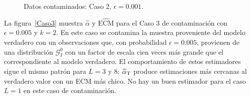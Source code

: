 \begin{figure}[h!]
	\caption{\label{Caso2}\small Datos contaminados: Caso 2, $\epsilon=0.001$.}
\end{figure}


La figura~\ref{Caso3} muestra $\widehat{\alpha}$ y $\widehat{\text{ECM}}$ para el Caso 3 de contaminación con $\epsilon=0.005$ y $k=2$. En este caso se contamina la muestra proveniente del modelo verdadero con un observaciones que, con probabilidad $\epsilon=0.005$, provienen de una distribución $\mathcal G_I^0$ con un factor de escala cien veces más grande que el correspondiente al modelo verdadero. El comportamiento de estos estimadores sigue el mismo patrón para $L=3 \text{ y } 8$: $\widehat\alpha_{\text T}$ produce estimaciones más cercanas al verdadero valor con un ECM más chico. No hay un buen estimador para el caso $L=1$ en este caso de contaminación.

